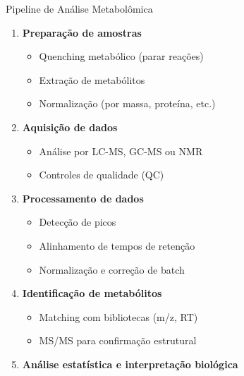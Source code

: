 \begin{frame}{Pipeline de Análise Metabolômica}
\begin{enumerate}
    \item \textbf{Preparação de amostras}
    \begin{itemize}
        \item Quenching metabólico (parar reações)
        \item Extração de metabólitos
        \item Normalização (por massa, proteína, etc.)
    \end{itemize}

    \item \textbf{Aquisição de dados}
    \begin{itemize}
        \item Análise por LC-MS, GC-MS ou NMR
        \item Controles de qualidade (QC)
    \end{itemize}

    \item \textbf{Processamento de dados}
    \begin{itemize}
        \item Detecção de picos
        \item Alinhamento de tempos de retenção
        \item Normalização e correção de batch
    \end{itemize}

    \item \textbf{Identificação de metabólitos}
    \begin{itemize}
        \item Matching com bibliotecas (m/z, RT)
        \item MS/MS para confirmação estrutural
    \end{itemize}

    \item \textbf{Análise estatística e interpretação biológica}
\end{enumerate}
\end{frame}

